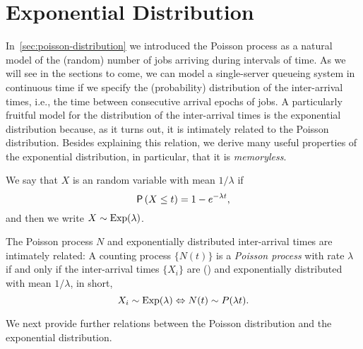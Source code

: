 \section{Exponential Distribution}
\label{sec:expon-distr}

In~\cref{sec:poisson-distribution} we introduced the Poisson process as a natural model of the (random) number of jobs arriving during intervals of time.
As we will see in the sections to come, we can model a single-server queueing system in continuous time if we specify the (probability) distribution of the inter-arrival times, i.e., the time between consecutive arrival epochs of jobs.
A particularly fruitful model for the distribution of the inter-arrival times is the exponential distribution because, as it turns out, it is intimately related to the Poisson distribution.
Besides explaining this relation, we derive many useful properties of the exponential distribution, in particular, that it is \emph{memoryless}.




We say that $X$ is an  random variable with mean $1/\lambda$ if 
\begin{equation*}
 \P{X \leq t} = 1- e^{-\lambda t},
\end{equation*}
and then we write $X\sim \operatorname{Exp}(\lambda)$.


The Poisson process $N$ and exponentially distributed inter-arrival times are intimately related: A counting process $\{N(t)\}$ is a \emph{Poisson process} with rate $\lambda$ if and only if the inter-arrival times $\{X_i\}$ are  () and exponentially distributed with mean $1/\lambda$, in short, 
\begin{equation*}
X_i\sim \operatorname{Exp}(\lambda) \Leftrightarrow N(t) \sim P(\lambda t).
\end{equation*}


We next provide further relations between the Poisson distribution and the exponential distribution. 


